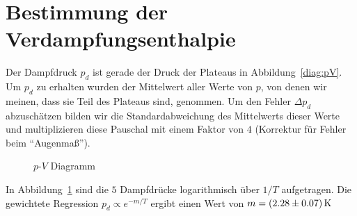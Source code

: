 \section{Bestimmung der Verdampfungsenthalpie}

Der Dampfdruck $p_d$ ist gerade der Druck der Plateaus in Abbildung~\ref{diag:pV}. Um $p_d$ zu erhalten wurden der Mittelwert aller Werte von $p$, von denen wir meinen, dass sie Teil des Plateaus sind, genommen. Um den Fehler $\Delta p_d$ abzuschätzen bilden wir die Standardabweichung des Mittelwerts dieser Werte und multiplizieren diese Pauschal mit einem Faktor von $4$ (Korrektur für Fehler beim "`Augenmaß"'). 


\begin{figure}    
    
    \caption{$p$-$V$ Diagramm}
    \label{diag:arr}
\end{figure}

In Abbildung~\ref{diag:arr} sind die $5$ Dampfdrücke logarithmisch über $1/T$ aufgetragen. Die gewichtete Regression $p_d \propto e^{-m/T}$ ergibt einen Wert von $m = \unit[(2.28 \pm 0.07)]{K}$


